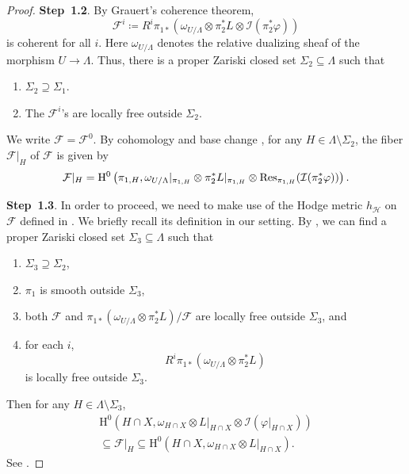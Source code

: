 \begin{proof}
\textbf{Step~1.2}.
By Grauert's coherence theorem,
\[
\mathcal{F}^i\coloneqq R^i\pi_{1*}\left(\omega_{U/\Lambda}\otimes \pi_2^*L\otimes \mathcal{I}(\pi_2^*\varphi) \right)
\]
is coherent for all $i$. Here $\omega_{U/\Lambda}$ denotes the relative dualizing sheaf of the morphism $U\rightarrow \Lambda$.
Thus, there is a proper Zariski closed set $\Sigma_2\subseteq \Lambda$ such that
\begin{enumerate}
    \item\label{itm:chapter-trace:L815:1} $\Sigma_2\supseteq \Sigma_1$.
    \item\label{itm:chapter-trace:L815:2} The $\mathcal{F}^i$'s are locally free outside $\Sigma_2$.
\end{enumerate}
We write $\mathcal{F}=\mathcal{F}^0$.
 By cohomology and base change \cite[Theorem~III.12.11]{Har}, for any $H\in \Lambda\setminus \Sigma_2$,
 the fiber $\mathcal{F}|_H$ of $\mathcal{F}$ is given by
 \[
\mathcal{F}|_H= \mathrm{H}^0\left(\pi_{1,H},\omega_{U/\Lambda}|_{\pi_{1,H}}\otimes \pi_2^*L|_{\pi_{1,H}}\otimes \operatorname{Res}_{\pi_{1,H}}(\mathcal{I}(\pi_2^*\varphi)) \right).
\]


\textbf{Step~1.3}.
In order to proceed, we need to make use of the Hodge metric $h_{\mathcal{H}}$ on $\mathcal{F}$ defined in \cite{HPS18}. We briefly recall its definition in our setting.
By \cite[Section~22]{HPS18}, we can find a proper Zariski closed set $\Sigma_3\subseteq \Lambda$ such that
\begin{enumerate}
    \item\label{itm:chapter-trace:L830:1} $\Sigma_3\supseteq \Sigma_2$,
    \item\label{itm:chapter-trace:L830:2} $\pi_1$ is smooth outside $\Sigma_3$,
    \item\label{itm:chapter-trace:L830:3} both $\mathcal{F}$ and $\pi_{1*}\left(\omega_{U/\Lambda}\otimes \pi_2^*L \right)/\mathcal{F}$ are locally free outside $\Sigma_3$, and
    \item\label{itm:chapter-trace:L830:4} for each $i$,
    \[
    R^i\pi_{1*}\left(\omega_{U/\Lambda}\otimes \pi_2^*L \right)
    \]
    is locally free outside $\Sigma_3$.
\end{enumerate}
Then for any $H\in \Lambda\setminus \Sigma_3$,
\[
\begin{gathered}
\mathrm{H}^0\left(H\cap X,\omega_{H\cap X}\otimes L|_{H\cap X}\otimes \mathcal{I}(\varphi|_{H\cap X})\right)\\
\subseteq \mathcal{F}|_H\subseteq \mathrm{H}^0\left(H\cap X,\omega_{H\cap X}\otimes L|_{H\cap X}\right).
\end{gathered}
\]
See \cite[Lemma~22.1]{HPS18}.


\end{proof}

